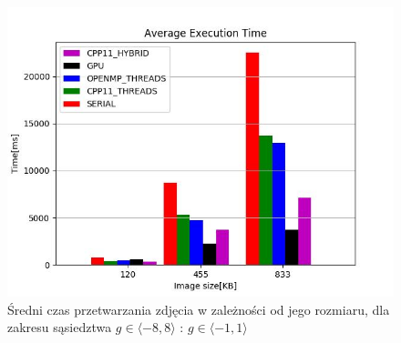 \documentclass[document.tex]{subfiles}
\begin{document}
\clearpage
\begin{figure}[h]
\includegraphics[scale=0.8]{imgs/plot5_lap.jpg}
\caption{Średni czas przetwarzania zdjęcia w zależności od jego rozmiaru, dla zakresu sąsiedztwa $g\in \langle -8, 8 \rangle$ : $g\in \langle -1, 1 \rangle$}
\label{fig:results_lap_hybrid}
\end{figure}
\clearpage

\end{document}
